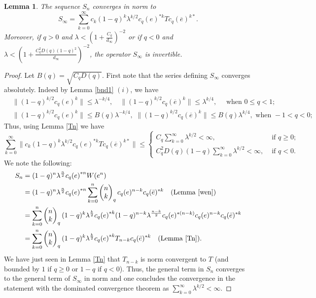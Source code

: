 \documentclass[12pt, a4paper,reqno]{amsart}
\newtheorem{Lemma}[Theorem]{Lemma}
\theoremstyle{definition}
\renewcommand{\leq}{\leqslant}
\renewcommand{\geq}{\geqslant}
\begin{document}
\begin{Lemma}\label{s}
The sequence $S_n$ converges in norm to $$\displaystyle{S_\infty =\sum_{k=0}^\infty c_k (1-q)^k\lambda^{k/2} c_q(e)^{*k}Tc_q(\overline e)^{k*}}.$$ Moreover, if $q>0$ and $\lambda<(1+\frac{C_q}{d_\infty})^{-2}$ or if $q<0$ and $\lambda<(1+\frac{C_q^2D(q)(1-q)^2}{d_\infty})^{-2}$, the operator $S_\infty$ is invertible.
\end{Lemma}


\begin{proof}
Let $B(q)= \sqrt{C_qD(q)}$. First note that the series defining $S_\infty$ converges absolutely. Indeed by Lemma \ref{bnd1} $(i)$, we have 
\begin{align*}
&\| (1-q)^{k/2}c_q(e)^k \|\leq \lambda^{-k/4}, \quad \| (1-q)^{k/2}c_q(\overline e)^k \|\leq\lambda^{k/4}, \quad\text{ when } 0\leq q<1;\\
&\| (1-q)^{k/2}c_q(e)^k \|\leq B(q)\lambda^{-k/4}, \,\, \| (1-q)^{k/2}c_q(\overline e)^k \|\leq B(q) \lambda^{k/4}, \text{ when } -1< q<0;
\end{align*}
Thus, using Lemma \ref{Tn} we have
\begin{equation*}
\sum_{k=0}^\infty \| c_k (1-q)^k\lambda^{k/2} c_q(e)^{*k}Tc_q(\overline e)^{k*} \| \leq \begin{cases} C_q \sum_{k=0}^\infty {\lambda}^{k/2}<\infty, &\text{ if } q\geq 0;\\ C_q^2D(q)(1-q)\sum_{k=0}^\infty {\lambda}^{k/2}<\infty, &\text{ if } q< 0. \end{cases}
\end{equation*}
We note the following:
\begin{align*}
S_n &= (1-q)^n \lambda^{ \frac{n}{2} }  {c_q(e)}^{ *n} W(e^{ n})\\
&=(1-q)^n \lambda^{ \frac{n}{2} }  {c_q(e)}^{ *n} 	\displaystyle \sum_{k=0}^{n}  \left( \begin{matrix} n\\ k \end{matrix}\right)_q c_q(e)^{n-k} c_q(\bar{e})^{* k} \quad (\text{Lemma \ref{wen}})\\
&=	\displaystyle \sum_{k=0}^{n}  \left( \begin{matrix} n\\ k \end{matrix}\right)_q  (1-q)^k \lambda^{ \frac{k}{2} }  {c_q(e)}^{ *k} (1-q)^{n-k} \lambda^{\frac{n-k}{2}}  c_q(e)^{* (n-k)}  c_q(e)^{n-k} c_q(\bar{e})^{* k}\\
&=	\displaystyle \sum_{k=0}^{n}  \left( \begin{matrix} n\\ k \end{matrix}\right)_q  (1-q)^k \lambda^{ \frac{k}{2} }  {c_q(e)}^{ *k} T_{n-k} c_q(\bar{e})^{* k} \quad (\text{Lemma \ref{Tn}}).
\end{align*}
We have just seen in Lemma \ref{Tn} that $T_{n-k}$ is norm convergent to $T$ (and bounded by $1$ if $q\geq 0$ or  $1-q$ if $q<0$). Thus, the general term in $S_n$ converges to the general term of $S_\infty$ in norm and one concludes the convergence in the statement with the dominated convergence theorem as $\sum_{k=0}^\infty \lambda^{k/2}<\infty$.


\end{proof}
\end{document}
